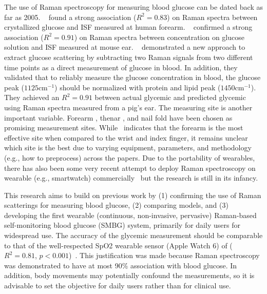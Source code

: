 The use of Raman spectroscopy for measuring blood glucose can be dated back as far as 2005.
~\cite{forearm2005} found a strong association ($R^2 = 0.83$) on Raman spectra between crystallized glucose and ISF measured at human forearm.
~\cite{solutionGlucose} confirmed a strong association ($R^2 = 0.91$) on Raman spectra between concentration on glucose solution and ISF measured at mouse ear.
~\cite{directGlucose} demonstrated a new approach to extract glucose scattering by subtracting two Raman signals from two different time points as a direct measurement of glucose in blood.
In addition, they validated that to reliably measure the glucose concentration in blood, the glucose peak ($1125 \text{cm}^{-1}$) should be normalized with protein and lipid peak ($1450 \text{cm}^{-1}$).
They achieved an $R^2 = 0.91$ between actual glycemic and predicted glycemic using Raman spectra measured from a pig's ear.
The measuring site is another important variable. Forearm \citep{forearm2005, forearm2014}, thenar \citep{glucobeam}, and nail fold \citep{ramanNailFold2019} have been chosen as promising measurement sites.
While~\cite{sitecompare} indicates that the forearm is the most effective site when compared to the wrist and index finger, it remains unclear which site is the best due to varying equipment, parameters, and methodology (e.g., how to preprocess) across the papers.
Due to the portability of wearables, there has also been some very recent attempt to deploy Raman spectroscopy on wearable (e.g., smartwatch) commercially~\cite{ramanGlucoseWatch} but the research is still in its infancy.

This research aims to build on previous work by 
(1) confirming the use of Raman scatterings for measuring blood glucose, 
(2) comparing models, and 
(3) developing the first wearable (continuous, non-invasive, pervasive) Raman-based self-monitoring blood glucose (SMBG) system, primarily for daily users for widespread use.
The accuracy of the glycemic measurement should be comparable to that of the well-respected SpO2 wearable sensor (Apple Watch 6) of ($R^2 = 0.81$, $p < 0.001$)~\citep{applewatchaccuracy}.
This justification was made because Raman spectroscopy was demonstrated to have at most 90\% association with blood glucose. 
In addition, body movements may potentially confound the measurements, so it is advisable to set the objective for daily users rather than for clinical use.


